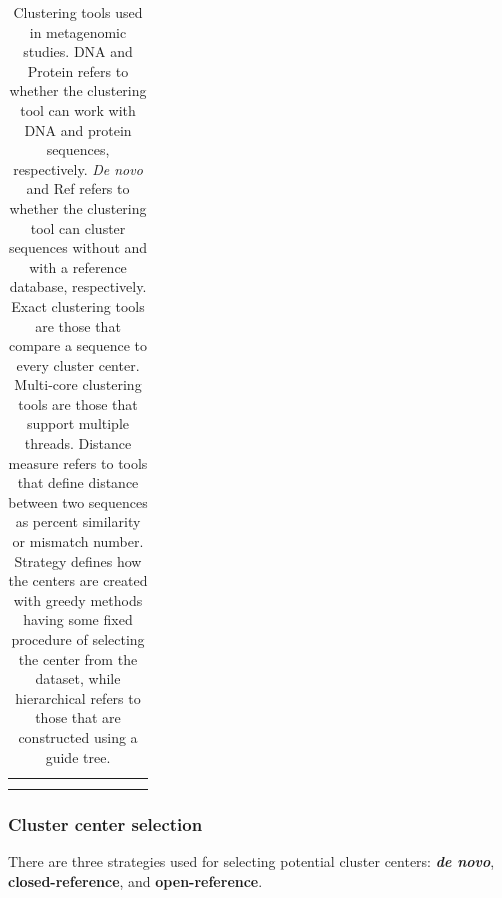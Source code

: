 \begin{table}[t!]
\begin{tabular}{@{}llcccccccc@{}}
\\
\\
\\
\bottomrule
\end{tabular}
\caption{Clustering tools used in metagenomic studies. DNA and Protein refers to whether the clustering tool can work with DNA and protein sequences, respectively.  \emph{De novo} and Ref refers to whether the clustering tool can cluster sequences without and with a reference database, respectively. Exact clustering tools are those that compare a sequence to every cluster center. Multi-core clustering tools are those that support multiple threads.  Distance measure refers to tools that define distance between two sequences as percent similarity or mismatch number.  Strategy defines how the centers are created with greedy methods having some fixed procedure of selecting the center from the dataset, while hierarchical refers to those that are constructed using a guide tree.}
\label{table:clustering_tools}
\hspace*{-1.5cm}
\end{table}



\subsubsection{Cluster center selection}



There are three strategies used for selecting potential cluster centers: {\bf \emph{de novo}}, {\bf closed-reference}, and {\bf open-reference}.

